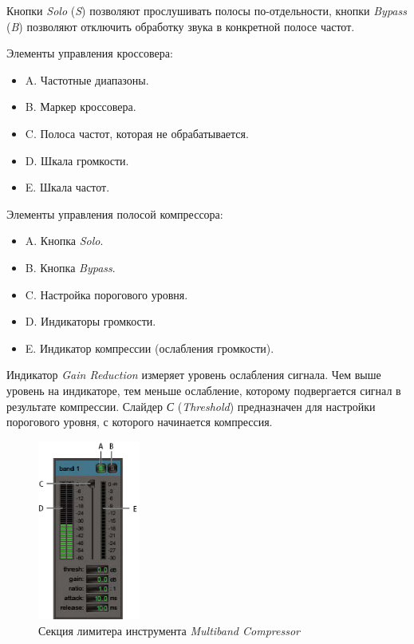 \documentclass[oneside, final, 14pt]{extreport}
\begin{document}
Кнопки \emph{Solo} (\emph{S}) позволяют прослушивать полосы по-отдельности, кнопки \emph{Bypass} (\emph{B}) позволяют отключить обработку звука в конкретной полосе частот.

Элементы управления кроссовера:
\begin{itemize}
  \item A. Частотные диапазоны.
  \item B. Маркер кроссовера.
  \item C. Полоса частот, которая не обрабатывается.
  \item D. Шкала громкости.
  \item E. Шкала частот.
\end{itemize}
	
Элементы управления полосой компрессора:
\begin{itemize}
  \item A. Кнопка \emph{Solo}.
  \item B. Кнопка \emph{Bypass}.
  \item C. Настройка порогового уровня.
  \item D. Индикаторы громкости.
  \item E. Индикатор компрессии (ослабления громкости).
\end{itemize}

Индикатор \emph{Gain Reduction} измеряет уровень ослабления сигнала. Чем выше уровень на индикаторе, тем меньше ослабление, которому подвергается сигнал в результате компрессии. Слайдер \emph{С} (\emph{Threshold}) предназначен для настройки порогового уровня, с которого начинается компрессия.

\begin{figure}[ht!]
  \centering
  \includegraphics[width=0.3\textwidth]{pic-multiband-02}
  \caption{Секция лимитера инструмента \emph{Multiband Compressor}}
  \label{pic-muliband-02}
\end{figure}
\end{document}
